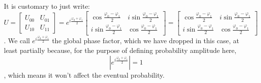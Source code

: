 \documentclass[12pt]{article}
\begin{document}
\begin{proposition}
It is customary to just write: $$
U
    = \begin{bmatrix}
        U_{00} & U_{01}\\
        U_{10} & U_{11}
    \end{bmatrix}
    = e^{i\frac{\varphi_0+\varphi_1}{2}}\begin{bmatrix}
        \cos\frac{\varphi_0 - \varphi_1}{2} & i\sin\frac{\varphi_0 - \varphi_1}{2}\\
        i\sin\frac{\varphi_0 - \varphi_1}{2} & \cos\frac{\varphi_0 - \varphi_1}{2}
    \end{bmatrix} = \boxed{\begin{bmatrix}
        \cos\frac{\varphi_0 - \varphi_1}{2} & i\sin\frac{\varphi_0 - \varphi_1}{2}\\
        i\sin\frac{\varphi_0 - \varphi_1}{2} & \cos\frac{\varphi_0 - \varphi_1}{2}
    \end{bmatrix}}
$$. We call $e^{i\frac{\varphi_0+\varphi_1}{2}}$ the global phase factor, which we have dropped in this case, at least partially because, for the purpose of defining probability amplitude here, $$
\left|e^{i\frac{\varphi_0+\varphi_1}{2}}\right| = 1
$$, which means it won't affect the eventual probability.
\end{proposition}
\end{document}
